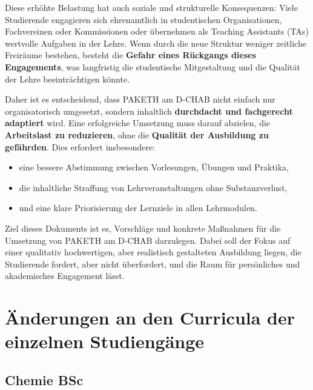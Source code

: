\documentclass[a4paper]{article}
\begin{document}
Diese erhöhte Belastung hat auch soziale und strukturelle Konsequenzen:  
Viele Studierende engagieren sich ehrenamtlich in studentischen Organisationen, Fachvereinen oder Kommissionen oder übernehmen als Teaching Assistants (TAs) wertvolle Aufgaben in der Lehre.  
Wenn durch die neue Struktur weniger zeitliche Freiräume bestehen, besteht die \textbf{Gefahr eines Rückgangs dieses Engagements}, was langfristig die studentische Mitgestaltung und die Qualität der Lehre beeinträchtigen könnte.  

Daher ist es entscheidend, dass PAKETH am D-CHAB nicht einfach nur organisatorisch umgesetzt, sondern inhaltlich \textbf{durchdacht und fachgerecht adaptiert} wird.  
Eine erfolgreiche Umsetzung muss darauf abzielen, die \textbf{Arbeitslast zu reduzieren}, ohne die \textbf{Qualität der Ausbildung zu gefährden}.  
Dies erfordert insbesondere:
\begin{itemize}[leftmargin=2em]
    \item eine bessere Abstimmung zwischen Vorlesungen, Übungen und Praktika,
    \item die inhaltliche Straffung von Lehrveranstaltungen ohne Substanzverlust,
    \item und eine klare Priorisierung der Lernziele in allen Lehrmodulen.
\end{itemize}

Ziel dieses Dokuments ist es, Vorschläge und konkrete Maßnahmen für die Umsetzung von PAKETH am D-CHAB darzulegen.  
Dabei soll der Fokus auf einer qualitativ hochwertigen, aber realistisch gestalteten Ausbildung liegen, die Studierende fordert, aber nicht überfordert, und die Raum für persönliches und akademisches Engagement lässt.

\section{Änderungen an den Curricula der einzelnen Studiengänge}

\subsection{Chemie BSc}

\end{document}

